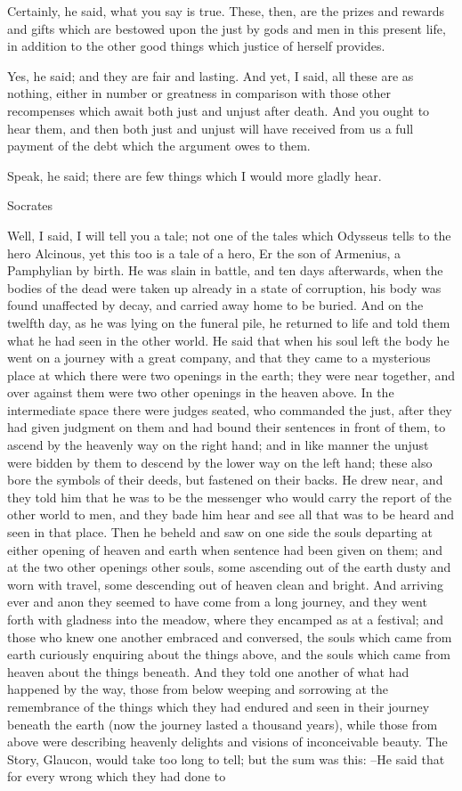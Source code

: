 Certainly, he said, what you say is true.
These, then, are the prizes and rewards and gifts which are bestowed upon the just by gods and men in this present life, in addition to the other good things which justice of herself provides.

Yes, he said; and they are fair and lasting.
And yet, I said, all these are as nothing, either in number or greatness in comparison with those other recompenses which await both just and unjust after death. And you ought to hear them, and then both just and unjust will have received from us a full payment of the debt which the argument owes to them.

Speak, he said; there are few things which I would more gladly hear.

Socrates

Well, I said, I will tell you a tale; not one of the tales which Odysseus tells to the hero Alcinous, yet this too is a tale of a hero, Er the son of Armenius, a Pamphylian by birth. He was slain in battle, and ten days afterwards, when the bodies of the dead were taken up already in a state of corruption, his body was found unaffected by decay, and carried away home to be buried. And on the twelfth day, as he was lying on the funeral pile, he returned to life and told them what he had seen in the other world. He said that when his soul left the body he went on a journey with a great company, and that they came to a mysterious place at which there were two openings in the earth; they were near together, and over against them were two other openings in the heaven above. In the intermediate space there were judges seated, who commanded the just, after they had given judgment on them and had bound their sentences in front of them, to ascend by the heavenly way on the right hand; and in like manner the unjust were bidden by them to descend by the lower way on the left hand; these also bore the symbols of their deeds, but fastened on their backs. He drew near, and they told him that he was to be the messenger who would carry the report of the other world to men, and they bade him hear and see all that was to be heard and seen in that place. Then he beheld and saw on one side the souls departing at either opening of heaven and earth when sentence had been given on them; and at the two other openings other souls, some ascending out of the earth dusty and worn with travel, some descending out of heaven clean and bright. And arriving ever and anon they seemed to have come from a long journey, and they went forth with gladness into the meadow, where they encamped as at a festival; and those who knew one another embraced and conversed, the souls which came from earth curiously enquiring about the things above, and the souls which came from heaven about the things beneath. And they told one another of what had happened by the way, those from below weeping and sorrowing at the remembrance of the things which they had endured and seen in their journey beneath the earth (now the journey lasted a thousand years), while those from above were describing heavenly delights and visions of inconceivable beauty. The Story, Glaucon, would take too long to tell; but the sum was this: --He said that for every wrong which they had done to 